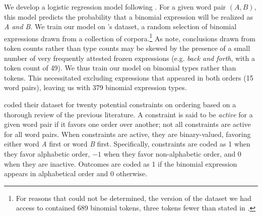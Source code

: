 \documentclass[authoryear]{elsarticle}
\begin{document}
We develop a logistic regression model following \citeauthor{Benor:2006gv}. For a given word pair $(A,B)$, this model predicts the probability that a binomial expression will be realized as \emph{A and B}. We train our model on \citeauthor{Benor:2006gv}'s dataset, a random selection of binomial expressions drawn from a collection of corpora.\footnote{For reasons that could not be determined, the version of the dataset we had access to contained 689 binomial tokens, three tokens fewer than stated in \citeauthor{Benor:2006gv}.} As \citeauthor{Benor:2006gv} note, conclusions drawn from token counts rather than type counts may be skewed by the presence of a small number of very frequently attested frozen expressions (e.g. \emph{back and forth}, with a token count of 49). We thus train our model on binomial types rather than tokens. This necessitated excluding expressions that appeared in both orders (15 word pairs), leaving us with 379 binomial expression types.

\citeauthor{Benor:2006gv} coded their dataset for twenty potential constraints on ordering based on a thorough review of the previous literature. A constraint is said to be \emph{active} for a given word pair if it favors one order over another; not all constraints are active for all word pairs. When constraints are active, they are binary-valued, favoring either word \emph{A} first or word \emph{B} first. Specifically, constraints are coded as 1 when they favor alphabetic order, $-1$ when they favor non-alphabetic order, and 0 when they are inactive. Outcomes are coded as 1 if the binomial expression appears in alphabetical order and 0 otherwise.
\end{document}
